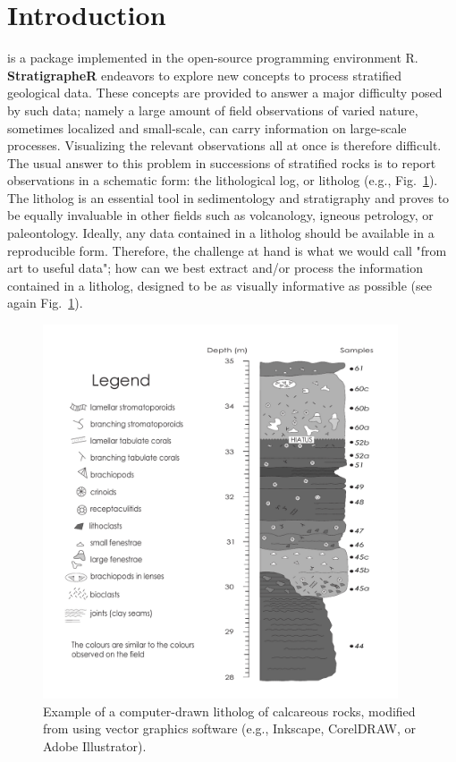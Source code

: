 \section{Introduction}
 is a package implemented in the open-source programming environment R. \textbf{StratigrapheR} endeavors to explore new concepts to process stratified geological data. These concepts are provided to answer a major difficulty posed by such data; namely a large amount of field observations of varied nature, sometimes localized and small-scale, can carry information on large-scale processes. Visualizing the relevant observations all at once is therefore difficult. The usual answer to this problem in successions of stratified rocks is to report observations in a schematic form: the lithological log, or litholog (e.g., Fig.~\ref{figure:drawnlog}). The litholog is an essential tool in sedimentology and stratigraphy and proves to be equally invaluable in other fields such as volcanology, igneous petrology, or paleontology. Ideally, any data contained in a litholog should be available in a reproducible form. Therefore, the challenge at hand is what we would call "from art to useful data"; how can we best extract and/or process the information contained in a litholog, designed to be as visually informative as possible (see again Fig.~\ref{figure:drawnlog}).
\begin{figure}[htbp]
	\centering
	\includegraphics[width=105mm]{Courbe litho SW 3}
	\caption{Example of a computer-drawn litholog of calcareous rocks, modified from \citet{humblet_sedimentology_2000} using vector graphics software (e.g., Inkscape, CorelDRAW, or Adobe Illustrator).}
	\label{figure:drawnlog}
\end{figure}

